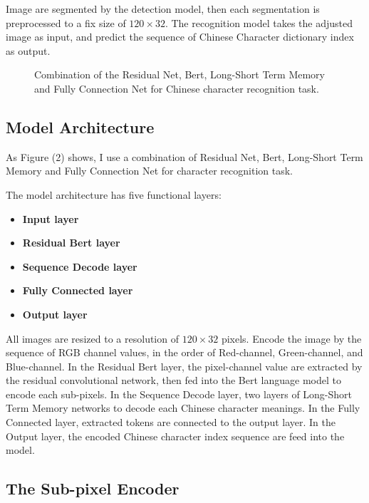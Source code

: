 \documentclass[10pt,twocolumn,letterpaper]{article}
\begin{document}
  Image are segmented by the detection model, then each segmentation is preprocessed to a fix size of $120\times32$.
The recognition model takes the adjusted image as input, and predict the sequence of Chinese Character dictionary index as output.


\begin{figure*}
\begin{center}
\end{center}
   \caption{Combination of the Residual Net, Bert, Long-Short Term Memory and Fully Connection Net for Chinese character recognition task.}
\label{fig:short}
\end{figure*}

\subsection{Model Architecture}

 As Figure (2) shows, I use a combination of Residual Net, Bert, Long-Short Term Memory and Fully Connection Net for character recognition task.

The model architecture has five functional layers:

\begin{itemize}
\item {\bf Input layer}
\item {\bf Residual Bert layer}
\item {\bf Sequence Decode layer}
\item {\bf Fully Connected layer}
\item {\bf Output layer}
\end{itemize}

All images are resized to a resolution of $120\times32$ pixels.
Encode the image by the sequence of RGB channel values, in the order of Red-channel, Green-channel, and Blue-channel.
In the Residual Bert  layer, the pixel-channel value are extracted by the residual convolutional network,
then fed into the Bert language model to encode each sub-pixels.
In the Sequence Decode layer, two layers of Long-Short Term Memory networks to decode each Chinese character meanings.
In the Fully Connected layer, extracted tokens are connected to the output layer.
In the Output layer, the encoded Chinese character index sequence are feed into the model.


\subsection{The Sub-pixel Encoder}
\end{document}
